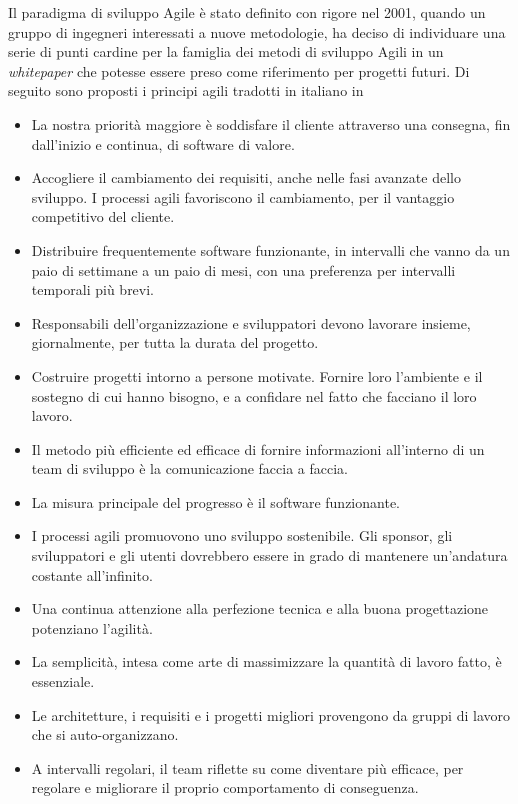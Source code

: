 Il paradigma di sviluppo Agile è stato definito con rigore nel 2001, quando un gruppo di ingegneri interessati a nuove metodologie, ha deciso di individuare una serie di punti cardine per la famiglia dei metodi di sviluppo Agili in un \textit{whitepaper} che potesse essere preso come riferimento per progetti futuri. Di seguito sono proposti i principi agili\cite{AgileManifesto} tradotti in italiano in\cite{Larman2016}
\begin{itemize}
    \item La nostra priorità maggiore è soddisfare il cliente attraverso una consegna, fin dall'inizio e continua, di software di valore.
    \item Accogliere il cambiamento dei requisiti, anche nelle fasi avanzate dello sviluppo. I processi agili favoriscono il cambiamento, per il vantaggio competitivo del cliente.
    \item Distribuire frequentemente software funzionante, in intervalli che vanno da un paio di settimane a un paio di mesi, con una preferenza per intervalli temporali più brevi.
    \item Responsabili dell'organizzazione e sviluppatori devono lavorare insieme, giornalmente, per tutta la durata del progetto.
    \item Costruire progetti intorno a persone motivate. Fornire loro l'ambiente e il sostegno di cui hanno bisogno, e a confidare nel fatto che facciano il loro lavoro.
    \item Il metodo più efficiente ed efficace di fornire informazioni all'interno di un team di sviluppo è la comunicazione faccia a faccia.
    \item La misura principale del progresso è il software funzionante.
    \item I processi agili promuovono uno sviluppo sostenibile. Gli sponsor, gli sviluppatori e gli utenti dovrebbero essere in grado di mantenere un'andatura costante all'infinito.
    \item Una continua attenzione alla perfezione tecnica e alla buona progettazione potenziano l'agilità.
    \item La semplicità, intesa come arte di massimizzare la quantità di lavoro fatto, è essenziale.
    \item Le architetture, i requisiti e i progetti migliori provengono da gruppi di lavoro che si auto-organizzano.
    \item A intervalli regolari, il team riflette su come diventare più efficace, per regolare e migliorare il proprio comportamento di conseguenza.
\end{itemize}

